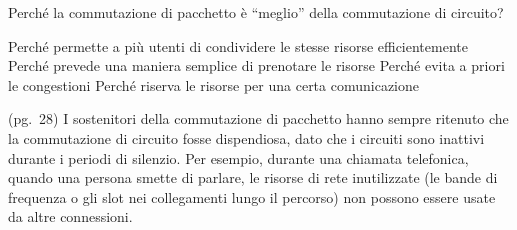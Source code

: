 \question
Perché la commutazione di pacchetto è \enquote{meglio} della commutazione di circuito?

\begin{checkboxes}
	\CorrectChoice Perché permette a più utenti di condividere le stesse risorse efficientemente
	\choice Perché prevede una maniera semplice di prenotare le risorse
	\choice Perché evita a priori le congestioni
	\choice Perché riserva le risorse per una certa comunicazione
\end{checkboxes}

\begin{solution}
(pg.\ 28)
I sostenitori della commutazione di pacchetto hanno sempre ritenuto che la commutazione di circuito fosse dispendiosa, dato che i circuiti sono inattivi durante i periodi di silenzio.
Per esempio, durante una chiamata telefonica, quando una persona smette di parlare, le risorse di rete inutilizzate (le bande di frequenza o gli slot nei collegamenti lungo il percorso) non possono essere usate da altre connessioni.
\end{solution}
